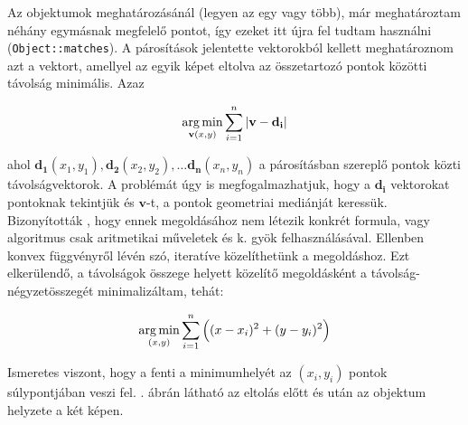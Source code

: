 Az objektumok meghatározásánál (legyen az egy vagy több), már meghatároztam néhány egymásnak megfelelő pontot, így ezeket itt újra fel tudtam használni (\texttt{Object::matches}). A párosítások jelentette vektorokból kellett meghatároznom azt a vektort, amellyel az egyik képet eltolva az összetartozó pontok közötti távolság minimális. Azaz

\[\operatorname*{arg\,min}_{\mathbf{v}(x, y)} \sum_{i=1}^{n} |\mathbf{v} - \mathbf{d_i}|\]

ahol $\mathbf{d_1}(x_1, y_1), \mathbf{d_2}(x_2, y_2), \ldots \mathbf{d_n}(x_n, y_n)$ a párosításban szereplő pontok közti távolságvektorok. A problémát úgy is megfogalmazhatjuk, hogy a $\mathbf{d_i}$ vektorokat pontoknak tekintjük és $\mathbf{v}$-t, a pontok geometriai mediánját keressük. Bizonyították \cite{Bajaj198699}, hogy ennek megoldásához nem létezik konkrét formula, vagy algoritmus csak aritmetikai műveletek és k. gyök felhasználásával. Ellenben konvex függvényről lévén szó, iteratíve közelíthetünk a megoldáshoz. Ezt elkerülendő, a távolságok összege helyett közelítő megoldásként a távolság-négyzetösszegét minimalizáltam, tehát:

\[\operatorname*{arg\,min}_{(x, y)} \sum_{i=1}^{n} \Big((x-x_i)^2 + (y-y_i)^2\Big)\]

Ismeretes viszont, hogy a fenti a minimumhelyét az $(x_i, y_i)$ pontok súlypontjában veszi fel. . ábrán látható az eltolás előtt és után az objektum helyzete a két képen.

